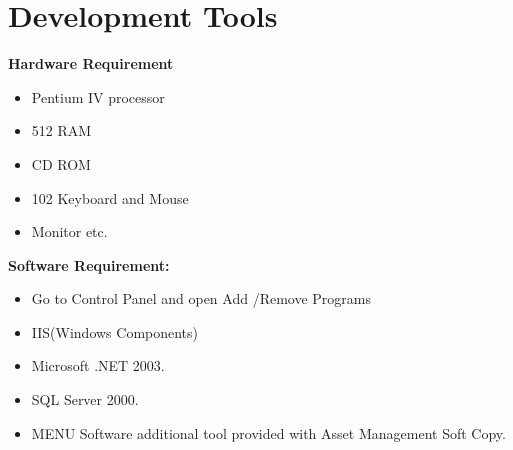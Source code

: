 \chapter{Development Tools}
\textbf{Hardware Requirement} \bf\begin{itemize}
\item Pentium IV processor
\item 512 RAM
\item CD ROM
\item 102 Keyboard and Mouse \cite{pressman}
\item Monitor etc.
\end{itemize}

\textbf{Software Requirement:}
\begin{itemize}
\item Go to Control Panel and open Add /Remove Programs
\item IIS(Windows Components)
\item Microsoft .NET 2003.
\item SQL Server 2000.
\item MENU Software additional tool provided with Asset
Management Soft Copy.
\end{itemize}
